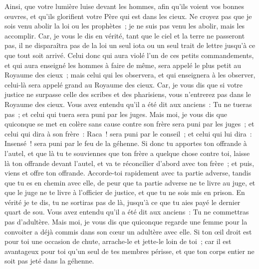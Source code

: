 \begin{multicols}{2}
Ainsi, que votre lumière luise devant les hommes, afin qu'ils voient vos bonnes œuvres, et qu'ils glorifient votre Père qui est dans les cieux.
Ne croyez pas que je sois venu abolir la loi ou les prophètes~; je ne suis pas venu les abolir, mais les accomplir.
Car, je vous le dis en vérité, tant que le ciel et la terre ne passeront pas, il ne disparaîtra pas de la loi un seul iota ou un seul trait de lettre jusqu'à ce que tout soit arrivé.
Celui donc qui aura violé l'un de ces petits commandements, et qui aura enseigné les hommes à faire de même, sera appelé le plus petit au Royaume des cieux~; mais celui qui les observera, et qui enseignera à les observer, celui-là sera appelé grand au Royaume des cieux.
Car, je vous dis que si votre justice ne surpasse celle des scribes et des pharisiens, vous n'entrerez pas dans le Royaume des cieux.
Vous avez entendu qu'il a été dit aux anciens~: Tu ne tueras pas~; et celui qui tuera sera puni par les juges.
Mais moi, je vous dis que quiconque se met en colère sans cause contre son frère sera puni par les juges~; et celui qui dira à son frère~: Raca~! sera puni par le conseil~; et celui qui lui dira~: Insensé~! sera puni par le feu de la géhenne.
Si donc tu apportes ton offrande à l'autel, et que là tu te souviennes que ton frère a quelque chose contre toi,
laisse là ton offrande devant l'autel, et va te réconcilier d'abord avec ton frère~; et puis, viens et offre ton offrande.
Accorde-toi rapidement avec ta partie adverse, tandis que tu es en chemin avec elle, de peur que ta partie adverse ne te livre au juge, et que le juge ne te livre à l'officier de justice, et que tu ne sois mis en prison.
En vérité je te dis, tu ne sortiras pas de là, jusqu'à ce que tu aies payé le dernier quart de sou.
Vous avez entendu qu'il a été dit aux anciens~: Tu ne commettras pas d'adultère.
Mais moi, je vous dis que quiconque regarde une femme pour la convoiter a déjà commis dans son cœur un adultère avec elle.
Si ton œil droit est pour toi une occasion de chute, arrache-le et jette-le loin de toi~; car il est avantageux pour toi qu'un seul de tes membres périsse, et que ton corps entier ne soit pas jeté dans la géhenne.

\end{multicols}
